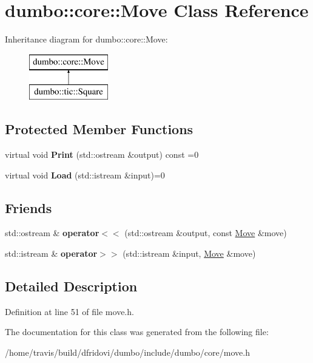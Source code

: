 \hypertarget{classdumbo_1_1core_1_1_move}{\section{dumbo\-:\-:core\-:\-:Move Class Reference}
\label{classdumbo_1_1core_1_1_move}
}
Inheritance diagram for dumbo\-:\-:core\-:\-:Move\-:\begin{figure}[H]
\begin{center}
\leavevmode
\includegraphics[height=2.000000cm]{classdumbo_1_1core_1_1_move}
\end{center}
\end{figure}
\subsection*{Protected Member Functions}
\begin{DoxyCompactItemize}
\item 
\hypertarget{classdumbo_1_1core_1_1_move_a9342b51029e64313ef79d443b8c31c20}{virtual void {\bfseries Print} (std\-::ostream \&output) const =0}\label{classdumbo_1_1core_1_1_move_a9342b51029e64313ef79d443b8c31c20}

\item 
\hypertarget{classdumbo_1_1core_1_1_move_aa7e93a65d69ca9f5ad22e2ee5a362411}{virtual void {\bfseries Load} (std\-::istream \&input)=0}\label{classdumbo_1_1core_1_1_move_aa7e93a65d69ca9f5ad22e2ee5a362411}

\end{DoxyCompactItemize}
\subsection*{Friends}
\begin{DoxyCompactItemize}
\item 
\hypertarget{classdumbo_1_1core_1_1_move_a1c86e73c26000947e25e7bc4b7f61b12}{std\-::ostream \& {\bfseries operator$<$$<$} (std\-::ostream \&output, const \hyperlink{classdumbo_1_1core_1_1_move}{Move} \&move)}\label{classdumbo_1_1core_1_1_move_a1c86e73c26000947e25e7bc4b7f61b12}

\item 
\hypertarget{classdumbo_1_1core_1_1_move_afa6f21808cceb074dc6bed218ee937e6}{std\-::istream \& {\bfseries operator$>$$>$} (std\-::istream \&input, \hyperlink{classdumbo_1_1core_1_1_move}{Move} \&move)}\label{classdumbo_1_1core_1_1_move_afa6f21808cceb074dc6bed218ee937e6}

\end{DoxyCompactItemize}


\subsection{Detailed Description}


Definition at line 51 of file move.\-h.



The documentation for this class was generated from the following file\-:\begin{DoxyCompactItemize}
\item 
/home/travis/build/dfridovi/dumbo/include/dumbo/core/move.\-h\end{DoxyCompactItemize}
